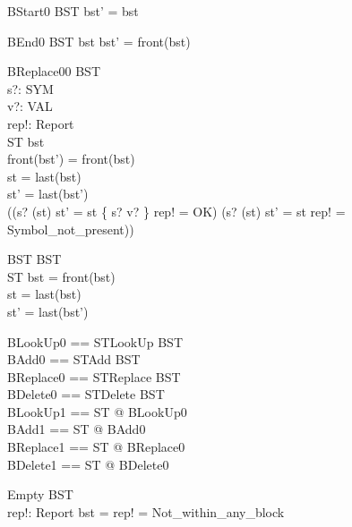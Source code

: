 \begin{schema}{BStart0}
  \Delta BST
\where
  bst' = bst \cat \langle \emptyset \rangle
\end{schema}

\begin{schema}{BEnd0}
  \Delta BST
\where
  bst \neq \langle\rangle \land bst' = front(bst)
\end{schema}

\begin{schema}{BReplace00}
  \Delta BST \\
  s?: SYM \\
  v?: VAL \\
  rep!: Report \\
  \Delta ST
\where
  bst \neq \langle\rangle \\
  front(bst') = front(bst) \\
  st = last(bst) \\
  st' = last(bst') \\
  ((s? \in \dom(st) \land st' = st \oplus \{ s? \mapsto v? \} \land rep! = OK)
    \lor
    (s? \notin \dom(st) \land st' = st \land rep! = Symbol\_not\_present))
\end{schema}

\begin{schema}{\Phi BST}
  \Delta BST \\
  \Delta ST
\where
  bst \neq \langle\rangle = front(bst) \\
  st = last(bst) \\
  st' = last(bst')
\end{schema}

\begin{zed}
  BLookUp0 == STLookUp \land \Phi BST \\
  BAdd0 == STAdd \land \Phi BST \\
  BReplace0 == STReplace \land \Phi BST \\
  BDelete0 == STDelete \land \Phi BST \\

  BLookUp1 == \exists \Delta ST @ BLookUp0 \\
  BAdd1 == \exists \Delta ST @ BAdd0 \\
  BReplace1 == \exists \Delta ST @ BReplace0 \\
  BDelete1 == \exists \Delta ST @ BDelete0
\end{zed}

\begin{schema}{Empty}
  \Xi BST \\
  rep!: Report
\where
  bst = \langle\rangle \land rep! = Not\_within\_any\_block
\end{schema}

